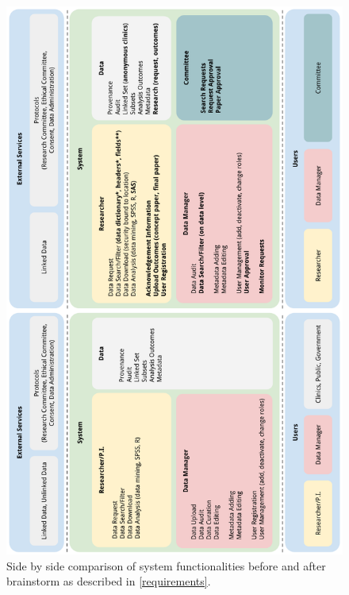 \begin{figure}[ht]
    \centering
	\includegraphics[height=0.6\textheight]{images/brainstorm-before-and-after}
    \caption{
    	Side by side comparison of system functionalities before and after brainstorm as described in \ref{requirements}.
   	}
    \label{fig:brainstorm-before-and-after}
\end{figure}